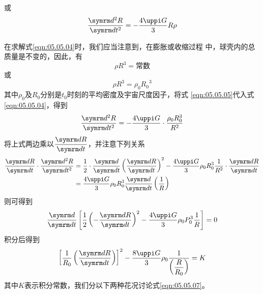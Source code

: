 \clearpage\noindent
或
\begin{equation}\label{eqn:05.05.04}
  \frac { \dif ^ { 2 } R } { \dif t ^ { 2 } } = - \frac { 4 \uppi G } { 3 } R \rho
\end{equation}

在求解式\eqref{eqn:05.05.04}时，我们应当注意到，在膨胀或收缩过程
中，球壳内的总质量是不变的，因此，有
\begin{equation*}
  \rho R ^ { 3 } = \text{常数}
\end{equation*}
或
\begin{equation}\label{eqn:05.05.05}
  \rho R ^ { 3 } = \rho _ 0 { R _ 0} ^ { 3 }
\end{equation}
其中$ \rho _ { 0 } $及$ R _ 0 $分别是$ t _ { 0 } $时刻的平均密度及宇宙尺度因子，将式
\eqref{eqn:05.05.05}代入式\eqref{eqn:05.05.04}，得到
\begin{equation}\label{eqn:05.05.06}
  \frac { \dif ^ { 2 } R } { \dif t ^ { 2 } } = - \frac { 4 \uppi G } { 3 } \cdot \frac { \rho _ { 0 } R _ { 0 } ^ { 3 } } { R ^ { 2 } }
\end{equation}
将上式两边乘以$ \dfrac { \dif R } { \dif t } $，并注意下列关系
\begin{equation*}
  \begin{aligned}
    \frac { \dif R } { \dif t } \cdot \frac { \dif ^ { 2 } R } { \dif t ^ { 2 } }
     & = \frac { 1 } { 2 } \cdot \frac { \dif } { \dif t } \left( \frac { \dif R } { \dif t } \right) ^ { 2 } - \frac { 4 \uppi G } { 3 } \rho _ { 0 } R _ { 0 } ^ { 3 } \frac { 1 } { R ^ { 2 } } \cdot \frac { \dif R } { \dif t } \\
     & = \frac { 4 \uppi G } { 3 } \rho _ { 0 } R _ 0 ^ { 3 } \frac { \dif } { \dif t } \left( \frac { 1 } { R } \right)
  \end{aligned}
\end{equation*}
则可得到
\begin{equation*}
  \frac { \dif } { \dif t } \left[ \frac { 1 } { 2 } \left( - \frac { \dif R } { \dif t } \right) ^ { 2 } - \frac { 4 \uppi G } { 3 } \rho _ { 0 } P _ { 0 } ^ { 3 } \frac { 1 } { R } \right] = 0
\end{equation*}
积分后得到
\begin{equation}\label{eqn:05.05.07}
  \left[ \frac { 1 } { R _ { 0 } } \left( \frac { \dif R } { \dif t } \right) \right] ^ { 2 } - \frac { 8 \uppi G } { 3 } \rho _ 0 \frac { 1 } {\left( \dfrac { R } { R _ { 0 } }\right)} = K
\end{equation}
其中$ K $表示积分常数，我们分以下两种花况讨论式\eqref{eqn:05.05.07}。

